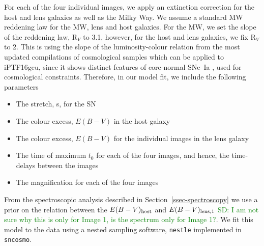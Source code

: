 \documentclass[a4paper,fleqn,usenatbib]{mnras}
\newcommand{\sd}[1]{\textcolor{green}{SD: #1}}
\begin{document}
For each of the four individual images, we apply an extinction correction for the host and lens galaxies as well as the Milky Way. We assume a standard MW reddening law \citep{1989ApJ...345..245C} for the MW, lens and host galaxies. For the MW, we set the slope of the reddening law, R$_V$ to 3.1, however, for the host and lens galaxies, we fix  R$_V$ to 2. This is using the slope of the luminosity-colour relation from the most updated compilations of cosmological samples \citep[see;][]{2018ApJ...859..101S,2018arXiv181102374D} which can be applied to iPTF16geu, since it shows distinct features of core-normal SNe~Ia \citep[e.g.,][]{2006PASP..118..560B}, used for cosmological constraints. Therefore, in our model fit, we include the following parameters 
\begin{itemize}
    \item The stretch, s, for the SN
    \item The colour excess, $E(B-V)$ in the host galaxy
    \item The colour excess, $E(B-V)$ for the individual images in the lens galaxy 
    \item The time of maximum $t_{0}$ for each of the four images, and hence, the time-delays between the images
    \item The magnification for each of the four images
\end{itemize}


From the spectroscopic analysis described in Section~\ref{ssec-spectroscopy}
we use a prior on the relation between the $E(B-V)_{\rm host}$  and $E(B-V)_{\rm lens, 1}$ \sd{I am not sure why this is only for Image 1, is the spectrum only for Image 1?}. We fit this model to the data using a nested sampling software, \texttt{nestle} implemented in \texttt{sncosmo}. 
\end{document}
